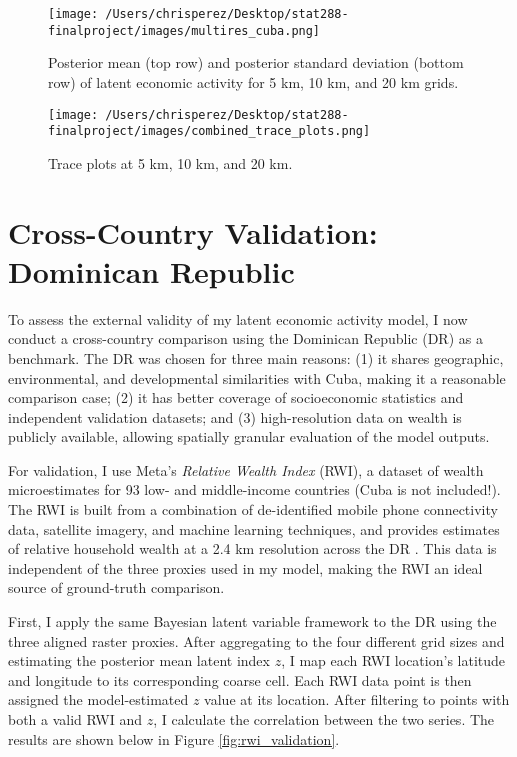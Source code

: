 \documentclass[12pt]{article}
\begin{document}
\begin{figure}[H]\centering
  \texttt{[image: /Users/chrisperez/Desktop/stat288-finalproject/images/multires\_cuba.png]}
  \caption{Posterior mean (top row) and posterior standard deviation (bottom row) of latent economic activity for 5 km, 10 km, and 20 km grids.}
  \label{fig:multires_maps}
  \end{figure}
  
  \begin{figure}[H]\centering
  \texttt{[image: /Users/chrisperez/Desktop/stat288-finalproject/images/combined\_trace\_plots.png]}
  \caption{Trace plots at 5 km, 10 km, and 20 km.}
  \label{fig:multires_trace}
  \end{figure}
  
  
\section{Cross-Country Validation: Dominican Republic}
\label{sec:validation}

To assess the external validity of my latent economic activity model, I now conduct a cross-country comparison using the Dominican Republic (DR) as a benchmark. The DR was chosen for three main reasons: (1) it shares geographic, environmental, and developmental similarities with Cuba, making it a reasonable comparison case; (2) it has better coverage of socioeconomic statistics and independent validation datasets; and (3) high-resolution data on wealth is publicly available, allowing spatially granular evaluation of the model outputs.

For validation, I use Meta's \textit{Relative Wealth Index} (RWI), a dataset of wealth microestimates for 93 low- and middle-income countries (Cuba is not included!). The RWI is built from a combination of de-identified mobile phone connectivity data, satellite imagery, and machine learning techniques, and provides estimates of relative household wealth at a 2.4 km resolution across the DR \parencite{chi2022microestimates}. This data is independent of the three proxies used in my model, making the RWI an ideal source of ground-truth comparison.

First, I apply the same Bayesian latent variable framework to the DR using the three aligned raster proxies. After aggregating to the four different grid sizes and estimating the posterior mean latent index \( z \), I map each RWI location's latitude and longitude to its corresponding coarse cell. Each RWI data point is then assigned the model-estimated \( z \) value at its location. After filtering to points with both a valid RWI and \( z \), I calculate the correlation between the two series. The results are shown below in Figure \ref{fig:rwi_validation}.
\end{document}
